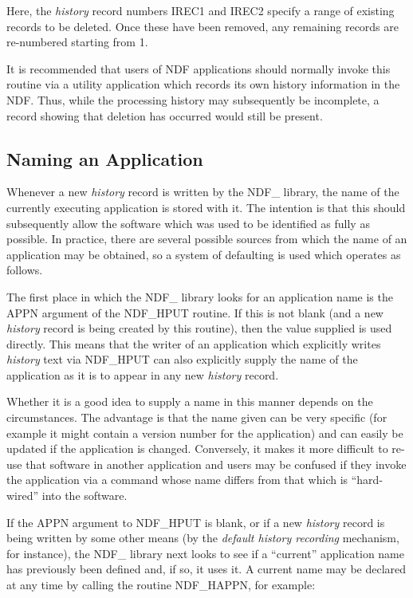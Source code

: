 \documentclass[twoside,11pt]{article}
\newcommand{\htmlref}[2]{#1}
\newcommand{\xlabel}[1]{}
\newcommand{\st}[1]{{\em{#1}}}
\begin{document}
Here, the \st{history\/} record numbers IREC1 and IREC2 specify a range of
existing records to be deleted. Once these have been removed, any
remaining records are re-numbered starting from 1.

It is recommended that users of NDF applications should normally
invoke this routine via a utility application which records its own
history information in the NDF. Thus, while the processing history may
subsequently be incomplete, a record showing that deletion has
occurred would still be present.

\subsection{\xlabel{naming_an_application}\label{ss:naminghistoryapp}Naming an Application}

Whenever a new \st{history\/} record is written by the NDF\_ library, the
name of the currently executing application is stored with it. The
intention is that this should subsequently allow the software which
was used to be identified as fully as possible. In practice, there are
several possible sources from which the name of an application may be
obtained, so a system of defaulting is used which operates as follows.

The first place in which the NDF\_ library looks for an application
name is the APPN argument of the \htmlref{NDF\_HPUT}{NDF_HPUT} routine. If this is not
blank (and a new \st{history\/} record is being created by this routine),
then the value supplied is used directly. This means that the writer
of an application which explicitly writes \st{history\/} text via NDF\_HPUT
can also explicitly supply the name of the application as it is to
appear in any new \st{history\/} record.

Whether it is a good idea to supply a name in this manner depends on
the circumstances. The advantage is that the name given can be very
specific (for example it might contain a version number for the
application) and can easily be updated if the application is changed.
Conversely, it makes it more difficult to re-use that software in
another application and users may be confused if they invoke the
application via a command whose name differs from that which is
``hard-wired'' into the software.

If the APPN argument to NDF\_HPUT is blank, or if a new \st{history\/} record
is being written by some other means (by the \st{default history recording\/}
mechanism, for instance), the NDF\_ library next looks to see if a
``current'' application name has previously been defined and, if so, it
uses it. A current name may be declared at any time by calling the
routine \htmlref{NDF\_HAPPN}{NDF_HAPPN}, for example:
\end{document}

